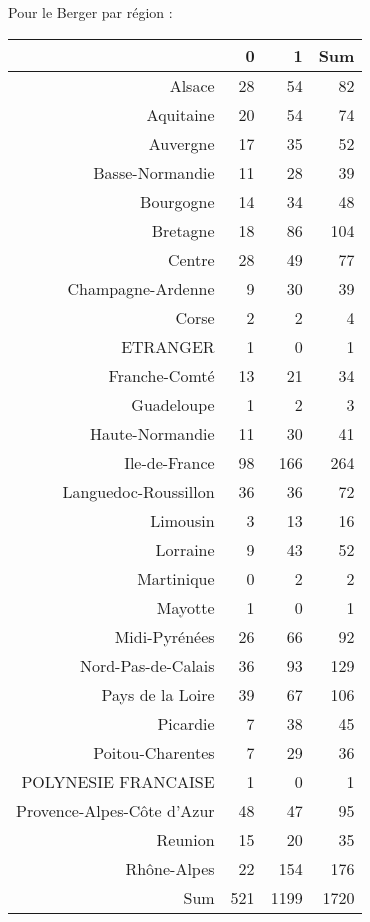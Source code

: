 \documentclass[11pt,a4paper]{article}\usepackage[]{graphicx}\usepackage[]{color}
\begin{document}
Pour le Berger par région :

\begin{table}[H]
\centering
\begin{tabular}{rrrr}
  \hline
 & 0 & 1 & Sum \\ 
  \hline
Alsace & 28 & 54 & 82 \\ 
  Aquitaine & 20 & 54 & 74 \\ 
  Auvergne & 17 & 35 & 52 \\ 
  Basse-Normandie & 11 & 28 & 39 \\ 
  Bourgogne & 14 & 34 & 48 \\ 
  Bretagne & 18 & 86 & 104 \\ 
  Centre & 28 & 49 & 77 \\ 
  Champagne-Ardenne & 9 & 30 & 39 \\ 
  Corse & 2 & 2 & 4 \\ 
  ETRANGER & 1 & 0 & 1 \\ 
  Franche-Comté & 13 & 21 & 34 \\ 
  Guadeloupe & 1 & 2 & 3 \\ 
  Haute-Normandie & 11 & 30 & 41 \\ 
  Ile-de-France & 98 & 166 & 264 \\ 
  Languedoc-Roussillon & 36 & 36 & 72 \\ 
  Limousin & 3 & 13 & 16 \\ 
  Lorraine & 9 & 43 & 52 \\ 
  Martinique & 0 & 2 & 2 \\ 
  Mayotte & 1 & 0 & 1 \\ 
  Midi-Pyrénées & 26 & 66 & 92 \\ 
  Nord-Pas-de-Calais & 36 & 93 & 129 \\ 
  Pays de la Loire & 39 & 67 & 106 \\ 
  Picardie & 7 & 38 & 45 \\ 
  Poitou-Charentes & 7 & 29 & 36 \\ 
  POLYNESIE FRANCAISE & 1 & 0 & 1 \\ 
  Provence-Alpes-Côte d'Azur & 48 & 47 & 95 \\ 
  Reunion & 15 & 20 & 35 \\ 
  Rhône-Alpes & 22 & 154 & 176 \\ 
  Sum & 521 & 1199 & 1720 \\ 
   \hline
\end{tabular}
\end{table}
\end{document}
